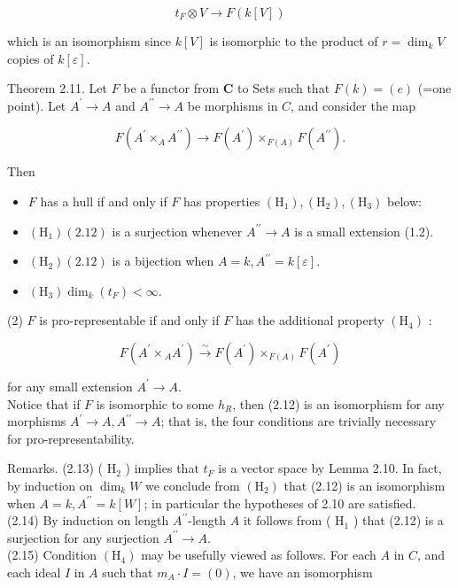 \documentclass[10pt]{article}
\begin{document}
$$
t_{F} \otimes V \rightarrow F(k[V])
$$

which is an isomorphism since $k[V]$ is isomorphic to the product of $r=\operatorname{dim}_{k} V$ copies of $k[\varepsilon]$.

Theorem 2.11. Let $F$ be a functor from $\boldsymbol{C}$ to Sets such that $F(k)=(e)$ (=one point). Let $A^{\prime} \rightarrow A$ and $A^{\prime \prime} \rightarrow A$ be morphisms in $C$, and consider the map


\begin{equation*}
F\left(A^{\prime} \times_{A} A^{\prime \prime}\right) \rightarrow F\left(A^{\prime}\right) \times_{F(A)} F\left(A^{\prime \prime}\right) . \tag{2.12}
\end{equation*}


Then

\begin{itemize}
  \item[(1)] $F$ has a hull if and only if $F$ has properties $\left(\mathrm{H}_{1}\right),\left(\mathrm{H}_{2}\right),\left(\mathrm{H}_{3}\right)$ below:
  \item[] $\left(\mathrm{H}_{1}\right)(2.12)$ is a surjection whenever $A^{\prime \prime} \rightarrow A$ is a small extension (1.2).
  \item[] $\left(\mathrm{H}_{2}\right)(2.12)$ is a bijection when $A=k, A^{\prime \prime}=k[\varepsilon]$.
  \item[] $\left(\mathrm{H}_{3}\right) \operatorname{dim}_{k}\left(t_{F}\right)<\infty$.
\end{itemize}

(2) $F$ is pro-representable if and only if $F$ has the additional property $\left(\mathrm{H}_{4}\right)$ :


\begin{equation*}
F\left(A^{\prime} \times{ }_{A} A^{\prime}\right) \xrightarrow{\sim} F\left(A^{\prime}\right) \times_{F(A)} F\left(A^{\prime}\right) \tag{4}
\end{equation*}


for any small extension $A^{\prime} \rightarrow A$.\\
Notice that if $F$ is isomorphic to some $h_{R}$, then (2.12) is an isomorphism for any morphisms $A^{\prime} \rightarrow A, A^{\prime \prime} \rightarrow A$; that is, the four conditions are trivially necessary for pro-representability.

Remarks. (2.13) ( $\mathrm{H}_{2}$ ) implies that $t_{F}$ is a vector space by Lemma 2.10. In fact, by induction on $\operatorname{dim}_{k} W$ we conclude from $\left(\mathrm{H}_{2}\right)$ that (2.12) is an isomorphism when $A=k, A^{\prime \prime}=k[W]$; in particular the hypotheses of 2.10 are satisfied.\\
(2.14) By induction on length $A^{\prime \prime}$-length $A$ it follows from ( $\mathrm{H}_{1}$ ) that (2.12) is a surjection for any surjection $A^{\prime \prime} \rightarrow A$.\\
(2.15) Condition $\left(\mathrm{H}_{4}\right)$ may be usefully viewed as follows. For each $A$ in $C$, and each ideal $I$ in $A$ such that $m_{A} \cdot I=(0)$, we have an isomorphism
\end{document}
